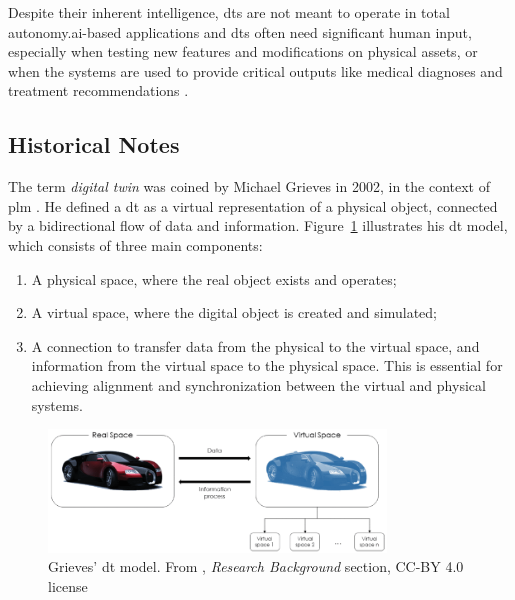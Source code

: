 Despite their inherent intelligence, \acrshort{dt}s are not meant to operate in total autonomy.\@ \acrshort{ai}-based applications and \acrshort{dt}s often need significant human input, especially when testing new features and modifications on physical assets, or when the systems are used to provide critical outputs like medical diagnoses and treatment recommendations \parencite{barricelliSurveyDigitalTwin2019}.

\subsection{Historical Notes}

The term \textit{digital twin} was coined by Michael Grieves in 2002, in the context of \acrfull{plm} \parencite{grievesDigitalTwinManufacturing2014,grievesDigitalTwinMitigating2017}. He defined a \acrshort{dt} as a virtual representation of a physical object, connected by a bidirectional flow of data and information. Figure~\ref{fig:grieves_digital_twin} illustrates his \acrshort{dt} model, which consists of three main components:
\begin{enumerate}
    \item A physical space, where the real object exists and operates;
    \item A virtual space, where the digital object is created and simulated;
    \item A connection to transfer data from the physical to the virtual space, and information from the virtual space to the physical space. This is essential for achieving alignment and synchronization between the virtual and physical systems.
\end{enumerate}

\begin{figure}
    \centering
    \includegraphics[width=0.8\textwidth]{images/digital_twins/dt_model_grieves.png}
    \caption[Grieves' \acrshort{dt} model]{Grieves' \acrshort{dt} model. From \textcite{barricelliSurveyDigitalTwin2019}, \textit{Research Background} section, CC-BY 4.0 license}%
    \label{fig:grieves_digital_twin}
\end{figure}

